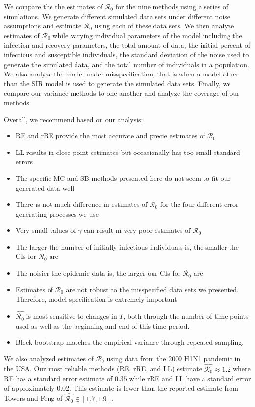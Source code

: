 \documentclass[12pt]{article}
\newcommand{\wxxsir}{nine } %
\newcommand{\rr}{\ensuremath{\mathcal{R}_0}}
\begin{document}
We compare the the estimates of $\rr$ for the \wxxsir methods using a series of simulations.  We generate different simulated data sets under different noise assumptions and estimate $\rr$ using each of these data sets.  We then analyze estimates of $\rr$ while varying individual parameters of the model including the infection and recovery parameters, the total amount of data, the initial percent of infectious and susceptible individuals, the standard deviation of the noise used to generate the simulated data, and the total number of individuals in a population.  We also analyze the model under misspecification, that is when a model other than the SIR model is used to generate the simulated data sets.  Finally, we compare our variance methods to one another and analyze the coverage of our methods.


Overall, we recommend based on our analysis:
\begin{itemize}
  \item RE and rRE provide the most accurate and precie estimates of $\rr$
  \item LL results in close point estimates but occasionally has too small standard errors
  \item The specific MC and SB methods presented here do not seem to fit our generated data well
  \item There is not much difference in estimates of $\rr$ for the four different error generating processes we use
  \item Very small values of $\gamma$ can result in very poor estimates of $\rr$
  \item The larger the number of initially infectious individuals is, the smaller the CIs for $\rr$ are
  \item The noisier the epidemic data is, the larger our CIs for $\rr$ are
  \item Estimates of $\rr$ are not robust to the misspecified data sets we presented.  Therefore, model specification is extremely important
    \item $\hat{\rr}$ is most sensitive to changes in $T$, both through the number of time points used as well as the beginning and end of this time period.
  \item Block bootstrap matches the empirical variance through repeated sampling.
  \end{itemize}

  We also analyzed estimates of $\rr$ using data from the 2009 H1N1 pandemic in the USA.  Our most reliable methods (RE, rRE, and LL) estimate $\hat{\rr}\approx 1.2$ where RE has a standard error estimate of $0.35$ while rRE and LL have a standard error of approximately 0.02.  This estimate is lower than the reported estimate from Towers and Feng of $\hat{\rr} \in [1.7, 1.9]$.
\end{document}
